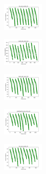 \begin{figure}[H]
    \centering
    \begin{subfigure}
        \centering
        \includegraphics[width=0.234\textwidth]{img/bmb/iris_set_const_20_949004259_cost.png}
    \end{subfigure}
    \hfill
    \begin{subfigure}
        \centering
        \includegraphics[width=0.234\textwidth]{img/bmb/ecoli_set_const_20_949004259_cost.png}
    \end{subfigure}
    \hfill
    \begin{subfigure}
        \centering
        \includegraphics[width=0.234\textwidth]{img/bmb/rand_set_const_20_949004259_cost.png}
    \end{subfigure}
    \hfill
    \begin{subfigure}
        \centering
        \includegraphics[width=0.234\textwidth]{img/bmb/newthyroid_set_const_20_949004259_cost.png}
    \end{subfigure}
    \hfill
    \begin{subfigure}
        \centering
        \includegraphics[width=0.234\textwidth]{img/bmb/iris_set_const_20_589741062_cost.png}
    \end{subfigure}
    \hfill
    \begin{subfigure}

\end{subfigure}
\end{figure}
